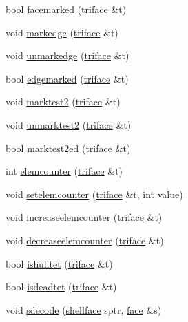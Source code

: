 \begin{DoxyCompactItemize}
bool \hyperlink{classtetgenmesh_abce189d194ae4f0d07f1bb4b80512761}{facemarked} (\hyperlink{classtetgenmesh_1_1triface}{triface} \&t)
\item 
void \hyperlink{classtetgenmesh_a82b69f60b4dec0ec3623c79c864db274}{markedge} (\hyperlink{classtetgenmesh_1_1triface}{triface} \&t)
\item 
void \hyperlink{classtetgenmesh_a8dec14c1e587c3a2312fbadcfcc74f01}{unmarkedge} (\hyperlink{classtetgenmesh_1_1triface}{triface} \&t)
\item 
bool \hyperlink{classtetgenmesh_ae4c94b6cfaa4a4c0e1919a8200cb1db4}{edgemarked} (\hyperlink{classtetgenmesh_1_1triface}{triface} \&t)
\item 
void \hyperlink{classtetgenmesh_aaeb2fae51d48efe3b6b320194a555177}{marktest2} (\hyperlink{classtetgenmesh_1_1triface}{triface} \&t)
\item 
void \hyperlink{classtetgenmesh_a036c9bf8613e411209c2ecf14c522ce7}{unmarktest2} (\hyperlink{classtetgenmesh_1_1triface}{triface} \&t)
\item 
bool \hyperlink{classtetgenmesh_ad4d3ded9c1d8981db9d25351381c2766}{marktest2ed} (\hyperlink{classtetgenmesh_1_1triface}{triface} \&t)
\item 
int \hyperlink{classtetgenmesh_a9e97b35e2103e74cbfb8a278e928bff6}{elemcounter} (\hyperlink{classtetgenmesh_1_1triface}{triface} \&t)
\item 
void \hyperlink{classtetgenmesh_af81bffae8fe3e074c0ff78257862071b}{setelemcounter} (\hyperlink{classtetgenmesh_1_1triface}{triface} \&t, int value)
\item 
void \hyperlink{classtetgenmesh_a2b8bc02e55e18d93a649b9a06901d493}{increaseelemcounter} (\hyperlink{classtetgenmesh_1_1triface}{triface} \&t)
\item 
void \hyperlink{classtetgenmesh_aa14427f959a82bb52f9a536f873676f6}{decreaseelemcounter} (\hyperlink{classtetgenmesh_1_1triface}{triface} \&t)
\item 
bool \hyperlink{classtetgenmesh_aa14f996a69b46afb1429ebf35a6e881c}{ishulltet} (\hyperlink{classtetgenmesh_1_1triface}{triface} \&t)
\item 
bool \hyperlink{classtetgenmesh_a155168de6a354f3b32c54dbc0710d55e}{isdeadtet} (\hyperlink{classtetgenmesh_1_1triface}{triface} \&t)
\item 
void \hyperlink{classtetgenmesh_ac5a50a5f6e277b5b95d58e40f3d58c2f}{sdecode} (\hyperlink{classtetgenmesh_ad4860123b88783b943fa6452e886a2cb}{shellface} sptr, \hyperlink{classtetgenmesh_1_1face}{face} \&s)
\item 

\end{DoxyCompactItemize}
